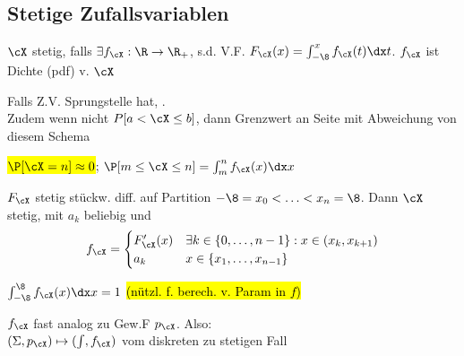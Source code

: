 \newpage
\subsection{Stetige Zufallsvariablen}
 $\cX$ stetig, falls $\exists f_\cX : \R \rightarrow \R_+$, s.d. V.F. $F_\cX(x) = \int_{-\8}^{x} f_\cX(t) \dx t$.
$f_\cX$ ist Dichte (pdf) v. $\cX$

Falls Z.V. Sprungstelle hat, .\\
Zudem wenn nicht $P[a < \cX \leq b]$, dann Grenzwert an Seite mit Abweichung von diesem Schema

\shortremark \hl{$\P[\cX = n] \approx 0$}; $\P[m \leq \cX \leq n] = \int_{m}^{n} f_\cX(x) \dx x$

\shorttheorem $F_\cX$ stetig stückw. diff. auf Partition $-\8 = x_0 < \ldots < x_n = \8$.
Dann $\cX$ stetig, mit $a_k$ beliebig und
\[
    f_\cX = \begin{cases}
        F_\cX'(x) & \exists k \in \{0, \ldots, n - 1\} : x \in (x_k, x_{k + 1}) \\
        a_k       & x \in \{ x_1, \ldots, x_{n - 1} \}
    \end{cases}
\]

\shorttheorem $\int_{-\8}^\8 f_\cX(x) \dx x = 1$ \hl{(nützl. f. berech. v. Param in $f$)}

\shortremark $f_\cX$ fast analog zu Gew.F $p_\cX$. Also:\\
$(\Sigma, p_\cX) \mapsto (\int, f_\cX)$ vom diskreten zu stetigen Fall

